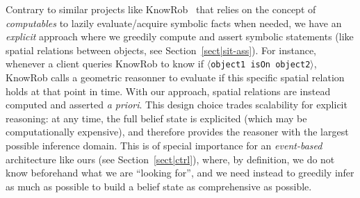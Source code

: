 \documentclass[preprint,3p,times]{elsarticle}
\newcommand{\stmt}[1]{{\footnotesize\tt$\langle$#1\relax$\rangle$}}
\begin{document}
Contrary to similar projects like KnowRob~\cite{Tenorth2009a} that relies on the
concept of \emph{computables} to lazily evaluate/acquire symbolic facts when
needed, we have an \emph{explicit} approach where we greedily compute and assert
symbolic statements (like spatial relations between objects, see
Section~\ref{sect|sit-ass}). For instance, whenever a client queries KnowRob to
know if \stmt{object1 isOn object2}, KnowRob calls a geometric reasonner to
evaluate if this specific spatial relation holds at that point in time. With our
approach, spatial relations are instead computed and asserted {\it a priori}.
This design choice trades scalability for explicit reasoning: at any time, the
full belief state is explicited (which may be computationally expensive), and
therefore provides the reasoner with the largest possible inference domain. This
is of special importance for an \emph{event-based} architecture like ours (see
Section~\ref{sect|ctrl}), where, by definition, we do not know beforehand what
we are ``looking for'', and we need instead to greedily infer as much as
possible to build a belief state as comprehensive as possible.
\end{document}
